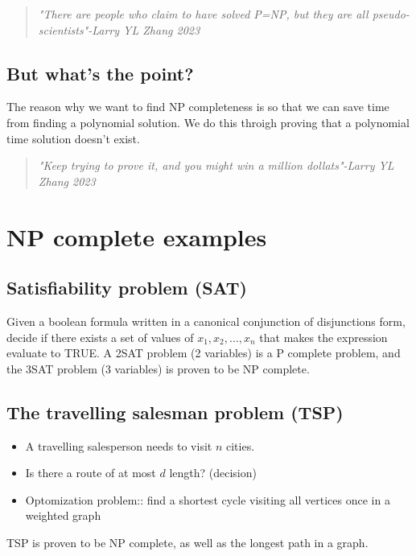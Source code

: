 \documentclass[12pt]{book}
\begin{document}
\begin{quote}
    \textit{"There are people who claim to have solved P=NP, but they are all pseudo-scientists"-Larry YL Zhang 2023}
\end{quote}

\subsection*{But what's the point?}

The reason why we want to find NP completeness is so that we can save time from finding a polynomial solution. We do this throigh proving that a polynomial time solution doesn't exist.

\begin{quote}
    \textit{"Keep trying to prove it, and you might win a million dollats"-Larry YL Zhang 2023}
\end{quote}

\section*{NP complete examples}

\subsection*{Satisfiability problem (SAT)}

Given a boolean formula written in a canonical conjunction of disjunctions form, decide if there exists a set of values of $x_1,x_2,\ldots,x_n$ that makes the expression evaluate to TRUE. A 2SAT problem (2 variables) is a P complete problem, and the 3SAT problem (3 variables) is proven to be NP complete.

\subsection*{The travelling salesman problem (TSP)}

\begin{itemize}
    \item A travelling salesperson needs to visit $n$ cities.
    \item Is there a route of at most $d$ length? (decision)
    \item Optomization problem:: find a shortest cycle visiting all vertices once in a weighted graph
\end{itemize}

TSP is proven to be NP complete, as well as the longest path in a graph.
\end{document}
